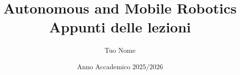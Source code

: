 \documentclass[11pt,a4paper,openany]{book}
\title{Autonomous and Mobile Robotics\\Appunti delle lezioni}
\author{Tuo Nome}
\date{Anno Accademico 2025/2026}
\begin{document}
\frontmatter


\tableofcontents
\listoffigures
\listoftables

\mainmatter


\backmatter
\printbibliography

\end{document}
